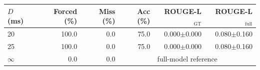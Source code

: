 \begin{tabular}{lrrrrr}
\toprule
$D$ (ms) & Forced (\%) & Miss (\%) & Acc (\%) & ROUGE-L$_{\text{GT}}$ & ROUGE-L$_{\text{full}}$ \\
\midrule
  20 & 100.0 & 0.0 & 75.0 & 0.000$\pm$0.000 & 0.080$\pm$0.160 \\
  25 & 100.0 & 0.0 & 75.0 & 0.000$\pm$0.000 & 0.080$\pm$0.160 \\
  $\infty$ & 0.0 & 0.0 & \multicolumn{3}{c}{full-model reference} \\
\bottomrule
\end{tabular}
